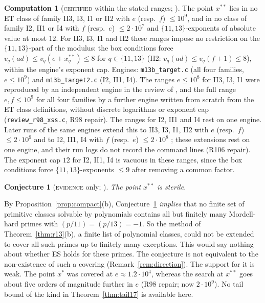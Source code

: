 \documentclass[11pt,reqno]{amsart}
\newtheorem{conjecture}[theorem]{Conjecture}
\theoremstyle{definition}
\newtheorem{computation}[theorem]{Computation}
\newcommand{\status}[1]{\textup{\textsc{#1}}}
\begin{document}
\begin{computation}[\status{certified} within the stated ranges; {\cite[Comp.~5.1, 5.3]{PM13B}}]\label{comp:xss}
The point $x^{**}$ lies in no ET class of family II3, I3, I1 or II2 with
$e$ (resp.\ $f$) $\le10^9$, and in no class of family I2, II1 or I4 with
$f$ (resp.\ $e$) $\le2\cdot10^7$ and $\{11,13\}$-exponents of absolute
value at most $12$.  For II3, I3, I1 and II2 these ranges impose no
restriction on the $\{11,13\}$-part of the modulus: the box conditions
force $v_q(ad)\le v_q(e+x^{**}_q)\le8$ for $q\in\{11,13\}$ (II2:
$v_q(ad)\le v_q(f+1)\le8$), within the engine's exponent cap.
Engines: \texttt{m13b\_target.c} (all four families, $e\le10^9$) and
\texttt{m13b\_target2.c} (I2, II1, I4).  The ranges $e\le10^8$ for II3, I3,
I1 were reproduced by an independent engine in the review of
\cite{PM13B}, and the full range $e,f\le10^9$ for all four families by a
further engine written from scratch from the ET class definitions, without
discrete logarithms or exponent cap (\texttt{review\_r98\_xss.c}, R98
repair).  The ranges for I2, II1 and I4 rest on one engine.
Later runs of the same engines extend this to II3, I3, I1, II2 with
$e$ (resp.\ $f$) $\le2\cdot10^9$ and to I2, II1, I4 with $f$ (resp.\ $e$)
$\le2\cdot10^8$ \cite[Comps.~5.1, 5.2]{PM13C}; these extensions rest on
one engine, and their run logs do not record the command lines
\cite[\S5]{PM13C} (R106 repair).  The exponent cap $12$ for I2, II1, I4 is vacuous in these ranges, since the
box conditions force $\{11,13\}$-exponents $\le9$ after removing a
common factor.
\end{computation}

\begin{conjecture}[\status{evidence} only; {\cite[Conj.~5.2]{PM13B}}]\label{conj:xss}
The point $x^{**}$ is sterile.
\end{conjecture}

By Proposition~\ref{prop:compact}(b), Conjecture~\ref{conj:xss}
\emph{implies} that no finite set of primitive classes solvable by
polynomials contains all but finitely many Mordell-hard primes with
$(p/11)=(p/13)=-1$.  So the method of Theorem~\ref{thm:r13}(b), a
finite list of polynomial classes, could not be extended to cover all such
primes up to finitely many exceptions.  This would say nothing about
whether ES holds for these primes.  The conjecture is not equivalent to
the non-existence of such a covering (Remark~\ref{rem:direction}).  The
support for it is weak.  The point $x^*$ was covered at
$e\approx1.2\cdot10^4$, whereas the search at $x^{**}$ goes about five
orders of magnitude further in $e$ (R98 repair; now $2\cdot10^9$).  No tail bound of the kind in
Theorem~\ref{thm:tail17} is available here.
\end{document}
